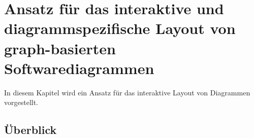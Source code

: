 
\chapter{Ansatz für das interaktive und diagrammspezifische Layout von graph-basierten Softwarediagrammen}
\label{chapter:interactive-approach}

In diesem Kapitel wird ein Ansatz für das interaktive Layout von Diagrammen vorgestellt.


\section{Überblick}




















